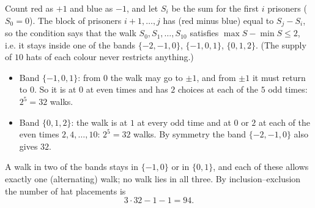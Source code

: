 Count red as $+1$ and blue as $-1$, and let $S_i$ be the sum for the first $i$ prisoners ($S_0=0$). The block of prisoners $i+1,\dots,j$ has (red minus blue) equal to $S_j-S_i$, so the condition says that the walk $S_0,S_1,\dots,S_{10}$ satisfies $\max S-\min S\le2$, i.e. it stays inside one of the bands $\{-2,-1,0\}$, $\{-1,0,1\}$, $\{0,1,2\}$. (The supply of $10$ hats of each colour never restricts anything.)
\begin{itemize}
\item Band $\{-1,0,1\}$: from $0$ the walk may go to $\pm1$, and from $\pm1$ it must return to $0$. So it is at $0$ at even times and has $2$ choices at each of the $5$ odd times: $2^5=32$ walks.
\item Band $\{0,1,2\}$: the walk is at $1$ at every odd time and at $0$ or $2$ at each of the even times $2,4,\dots,10$: $2^5=32$ walks. By symmetry the band $\{-2,-1,0\}$ also gives $32$.
\end{itemize}
A walk in two of the bands stays in $\{-1,0\}$ or in $\{0,1\}$, and each of these allows exactly one (alternating) walk; no walk lies in all three. By inclusion--exclusion the number of hat placements is
\[3\cdot32-1-1=\boxed{94}.\]
